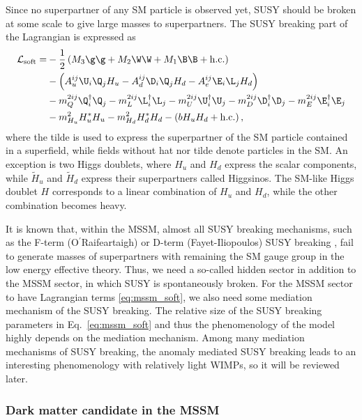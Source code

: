 \documentclass[12pt,twoside,book]{article}
\begin{document}
Since no superpartner of any SM particle is observed yet, SUSY should be broken at some scale to give large masses to superpartners.
The SUSY breaking part of the Lagrangian is expressed as
\begin{align}
  \mathcal{L}_{\mathrm{soft}} =&
  -\frac{1}{2} \left( M_3 \g \g + M_2 \W \W + M_1 \B \B + \mathrm{h.c.} \right) \notag \\&
  -\left( A_u^{ij} \U_i \Q_j H_u - A_d^{ij} \D_i \Q_j H_d - A_e^{ij} \E_i \L_j H_d \right) \notag \\&
  -m_Q^{2ij} \Q^\dagger_i \Q_j - m_L^{2ij} \L^\dagger_i \L_j - m_U^{2ij} \U^\dagger_i \U_j
  -m_D^{2ij} \D^\dagger_i \D_j - m_E^{2ij} \E^\dagger_i \E_j \notag \\&
  -m_{H_u}^2 H_u^{*} H_u - m_{H_d}^2 H_d^{*} H_d - \left( b H_u H_d + \mathrm{h.c.} \right),
  \label{eq:mssm_soft}
\end{align}
where the tilde is used to express the superpartner of the SM particle contained in a superfield, while fields without hat nor tilde denote particles in the SM.
An exception is two Higgs doublets, where $H_u$ and $H_d$ express the scalar components, while $\tilde{H}_u$ and $\tilde{H}_d$ express their superpartners called Higgsinos.
The SM-like Higgs doublet $H$ corresponds to a linear combination of $H_u$ and $H_d$, while the other combination becomes heavy.

It is known that, within the MSSM, almost all SUSY breaking mechanisms, such as the F-term (O$^{\mathrm{\prime}}$Raifeartaigh) \cite{ORaifeartaigh:1975nky} or D-term (Fayet-Iliopoulos) SUSY breaking \cite{Fayet:1974jb, Fayet:1974pd}, fail to generate masses of superpartners with remaining the SM gauge group in the low energy effective theory.
Thus, we need a so-called hidden sector in addition to the MSSM sector, in which SUSY is spontaneously broken.
For the MSSM sector to have Lagrangian terms \eqref{eq:mssm_soft}, we also need some mediation mechanism of the SUSY breaking.
The relative size of the SUSY breaking parameters in Eq.~\eqref{eq:mssm_soft} and thus the phenomenology of the model highly depends on the mediation mechanism.
Among many mediation mechanisms of SUSY breaking, the anomaly mediated SUSY breaking \cite{Giudice:1998xp, Randall:1998uk} leads to an interesting phenomenology with relatively light WIMPs, so it will be reviewed later.


\subsubsection*{Dark matter candidate in the MSSM}
\end{document}
